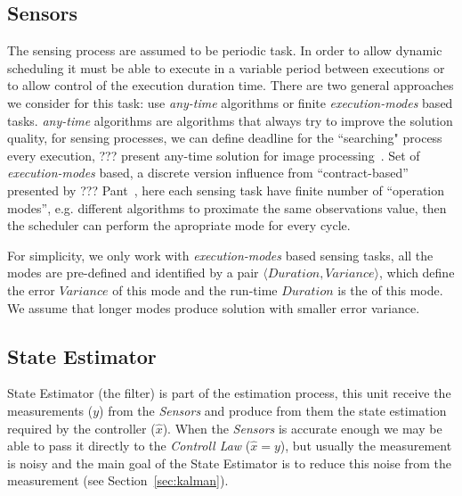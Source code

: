 \documentclass[ twoside, 12pt ]{article}
\begin{document}
{\subsection{Sensors}
\label{sec:sensors}
The sensing process are assumed to be periodic task. 
In order to allow dynamic scheduling it must be able to execute in a variable period between executions or to allow control of the execution duration time.
There are two general approaches we consider for this task: use \textit{any-time} algorithms or finite \textit{execution-modes} based tasks.
\textit{any-time} algorithms are algorithms that always try to improve the solution quality, for sensing processes, we can define deadline for the ``searching" process every execution, ??? present any-time solution for image processing~\cite{Shlomo}.
Set of \textit{execution-modes} based, a discrete version influence from ``contract-based'' presented by ??? Pant~\cite{UPenn-Pant}, here each sensing task have finite number of ``operation modes'', e.g. different algorithms to proximate the same observations value, then the scheduler can perform the apropriate mode for every cycle.

For simplicity, we only work with \textit{execution-modes} based sensing tasks, all the modes are pre-defined and identified by a pair $\langle Duration, Variance \rangle$,
which define the error $Variance$ of this mode and the run-time $Duration$ is the of this mode. 
We assume that longer modes produce solution with smaller error variance.

\subsection{State Estimator}
\label{sec:estimator}

State Estimator (the filter) is part of the estimation process, this unit receive the measurements ($y$) from the \textit{Sensors} and produce from them the state estimation required by the controller ($\hat{x}$).
When the \textit{Sensors} is accurate enough we may be able to pass it directly to the \textit{Controll Law} ($\hat{x} = y$), but usually the measurement is noisy and the main goal of the State Estimator is to reduce this noise from the measurement (see Section~\ref{sec:kalman}).

}
\end{document}
